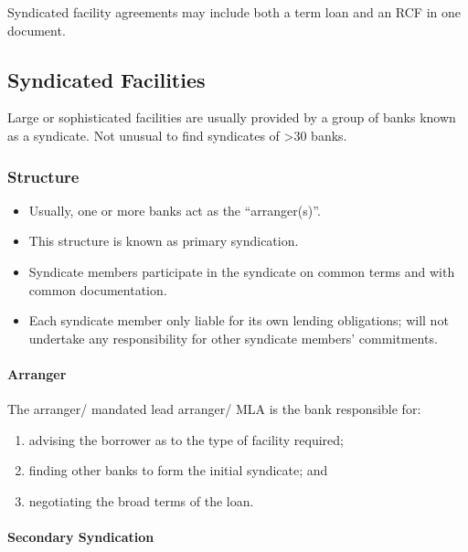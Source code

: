\documentclass[
]{article}
\providecommand{\tightlist}{%
  \setlength{\itemsep}{0pt}\setlength{\parskip}{0pt}}
\begin{document}
Syndicated facility agreements may include both a term loan and an RCF
in one document.

\hypertarget{syndicated-facilities}{%
\subsection{Syndicated Facilities}\label{syndicated-facilities}}

Large or sophisticated facilities are usually provided by a group of
banks known as a syndicate. Not unusual to find syndicates of
\textgreater30 banks.

\hypertarget{structure}{%
\subsubsection{Structure}\label{structure}}

\begin{itemize}
\tightlist
\item
  Usually, one or more banks act as the ``arranger(s)''.
\item
  This structure is known as primary syndication.
\item
  Syndicate members participate in the syndicate on common terms and
  with common documentation.
\item
  Each syndicate member only liable for its own lending obligations;
  will not undertake any responsibility for other syndicate members'
  commitments.
\end{itemize}

\hypertarget{arranger}{%
\paragraph{Arranger}\label{arranger}}

The arranger/ mandated lead arranger/ MLA is the bank responsible for:

\begin{enumerate}
\tightlist
\item
  advising the borrower as to the type of facility required;
\item
  finding other banks to form the initial syndicate; and
\item
  negotiating the broad terms of the loan.
\end{enumerate}

\hypertarget{secondary-syndication}{%
\paragraph{Secondary Syndication}\label{secondary-syndication}}
\end{document}
